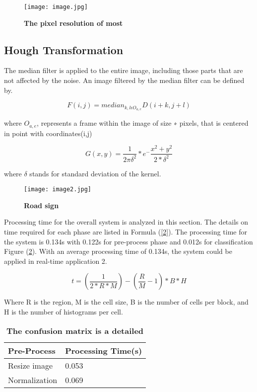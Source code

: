 \documentclass[11pt]{article}
\begin{document}
\begin{figure}[H]
    \raggedright
    \texttt{[image: image.jpg]}
    \caption{\textbf{The pixel resolution of most} }
    \label{1}
\end{figure}

\subsection{Hough Transformation}
 The median filter is applied to the entire image, including those parts that are not affected by the noise. An image filtered by the median filter can be defined by.\par
\noindent
\begin{equation}
F(i,j)=median_{k,l\epsilon O_{a,e}}{D(i+k,j+l)} \label{2}
\end{equation}



\raggedright where $O_{a,e}$, represents a frame within the image of size ∗ pixels, that is centered in point with coordinates(i,j)\par
\begin{equation}
G(x,y)=\frac{1}{2 \pi \delta^2} * e^-{\frac{x^2+y^2}{2*\delta^2}} \label{3}
\end{equation} 
\raggedright where $\delta$ stands for standard deviation of the kernel.\par
\begin{figure}[H]
    \raggedright
    \texttt{[image: image2.jpg]}
    \caption{\textbf{Road sign} }
    \label{4}
\end{figure}\par

 Processing time for the overall system is analyzed in this section. The details on time required for each phase are listed in Formula (\ref{2}). The processing time for the system is 0.134s with 0.122s for pre-process phase and 0.012s for classification Figure (\ref{4}). With an average processing time of 0.134s, the system could be applied in real-time application 2. \par
\noindent
\begin{equation}
t=(\frac{1}{2*R*M})-(\frac{R}{M}-1)*B*H \label{5}
\end{equation}
\raggedright Where R is the region, M is the cell size, B is the number of cells per block, and H is the number of histograms per cell.\par
\begin{table}[h!]
    \begin{center}
        \caption{\textbf{The confusion matrix is a detailed}}
        \label{6}
          \begin{tabular}{|p{3cm}|p{4cm}|}
          \hline
           Pre-Process&Processing Time(s)\\
          \hline
          Resize image&0.053\\
          \hline
          Normalization&0.069\\
          \hline
          \end{tabular}
   \end{center}
\end{table}
\newpage
\end{document}
